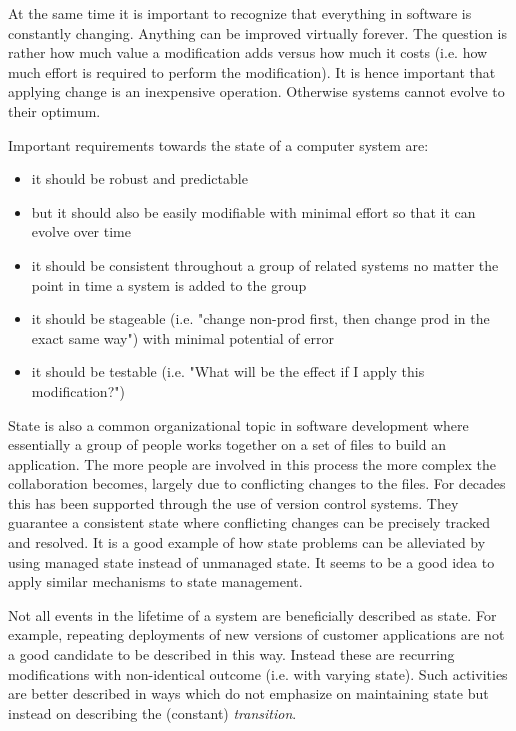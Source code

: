 \documentclass[12pt, a4paper]{article}
\begin{document}
At the same time it is important to recognize that everything in software is constantly changing. Anything can be improved virtually forever. The question is rather how much value a modification adds versus how much it costs (i.e. how much effort is required to perform the modification). It is hence important that applying change is an inexpensive operation. Otherwise systems cannot evolve to their optimum.


\vspace{0.5cm}
\begin{minipage}{\textwidth}
Important requirements towards the state of a computer system are:

\begin{itemize}
  \item it should be robust and predictable
  \item but it should also be easily modifiable with minimal effort so that it can evolve over time
  \item it should be consistent throughout a group of related systems no matter the point in time a system is added to the group
  \item it should be stageable (i.e. "change non-prod first, then change prod in the exact same way") with minimal potential of error
  \item it should be testable (i.e. "What will be the effect if I apply this modification?")
\end{itemize}
\end{minipage}
\vspace{0.5cm}

State is also a common organizational topic in software development where essentially a group of people works together on a set of files to build an application. The more people are involved in this process the more complex the collaboration becomes, largely due to conflicting changes to the files. For decades this has been supported through the use of version control systems. They guarantee a consistent state where conflicting changes can be precisely tracked and resolved. It is a good example of how state problems can be alleviated by using managed state instead of unmanaged state. It seems to be a good idea to apply similar mechanisms to state management. 

Not all events in the lifetime of a system are beneficially described as state. For example, repeating deployments of new versions of customer applications are not a good candidate to be described in this way. Instead these are recurring modifications with non-identical outcome (i.e. with varying state). Such activities are better described in ways which do not emphasize on maintaining state but instead on describing the (constant) \textit{transition}.
\end{document}
